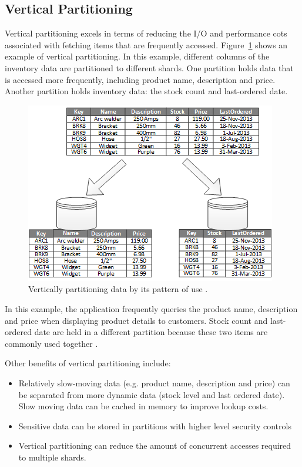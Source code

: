 \subsection{Vertical Partitioning}
Vertical partitioning excels in terms of reducing the I/O and performance cots associated with fetching items that are frequently accessed. Figure~\ref{fig:vertical-partitioning} shows an example of vertical partitioning. In this example, different columns of the inventory data are partitioned to different shards. One partition holds data that is accessed more frequently, including product name, description and price. Another partition holds inventory data: the stock count and last-ordered date. 
\begin{figure}[h]
  \centering
  \includegraphics{figures/veritical-partitioning.png}
  \caption{Vertically partitioning data by its pattern of use \cite{Datapart51:online}.}
  \label{fig:vertical-partitioning}
\end{figure}

In this example, the application frequently queries the product name, description and price when displaying product details to customers. Stock count and last-ordered date are held in a different partition because these two items are commonly used together \cite{Datapart51:online}.

Other benefits of vertical partitioning include:
\begin{itemize}
    \item Relatively slow-moving data (e.g. product name, description and price) can be separated from more dynamic data (stock level and last ordered date). Slow moving data can be cached in memory to improve lookup costs.
    \item Sensitive data can be stored in partitions with higher level security controls
    \item Vertical partitioning can reduce the amount of concurrent accesses required to multiple shards.
\end{itemize}


